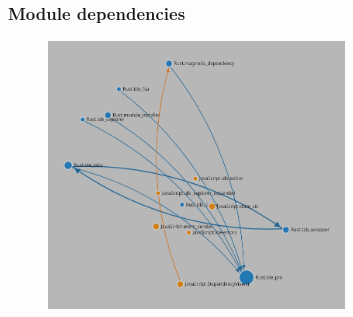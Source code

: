 \begin{frame}
  \frametitle{Module dependencies}
  \begin{figure}
    \centering
      \includegraphics[width=0.7\textwidth]{./pics/module-dependencies.png}
  \end{figure}
\end{frame}
